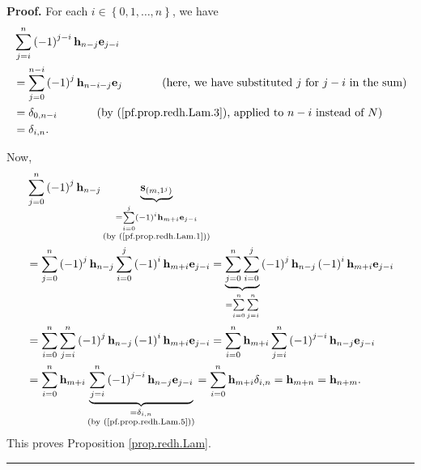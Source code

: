 \documentclass[numbers=enddot,12pt,final,onecolumn,notitlepage]{scrartcl}%
\theoremstyle{definition}
\newenvironment{proof}[1][Proof]{\noindent\textbf{#1.} }{\ \rule{0.5em}{0.5em}}
\let\sumnonlimits\sum
\renewcommand{\sum}{\sumnonlimits\limits}
\begin{document}
\begin{proof}
For each $i\in\left\{  0,1,\ldots,n\right\}  $, we have%
\begin{align}
&  \sum_{j=i}^{n}\left(  -1\right)  ^{j-i}\mathbf{h}_{n-j}\mathbf{e}%
_{j-i}\nonumber\\
&  =\sum_{j=0}^{n-i}\left(  -1\right)  ^{j}\mathbf{h}_{n-i-j}\mathbf{e}%
_{j}\ \ \ \ \ \ \ \ \ \ \left(  \text{here, we have substituted }j\text{ for
}j-i\text{ in the sum}\right) \nonumber\\
&  =\delta_{0,n-i}\ \ \ \ \ \ \ \ \ \ \left(  \text{by
(\ref{pf.prop.redh.Lam.3}), applied to }n-i\text{ instead of }N\right)
\nonumber\\
&  =\delta_{i,n}. \label{pf.prop.redh.Lam.5}%
\end{align}


Now,%
\begin{align*}
&  \sum_{j=0}^{n}\left(  -1\right)  ^{j}\mathbf{h}_{n-j}\underbrace{\mathbf{s}%
_{\left(  m,1^{j}\right)  }}_{\substack{=\sum_{i=0}^{j}\left(  -1\right)
^{i}\mathbf{h}_{m+i}\mathbf{e}_{j-i}\\\text{(by (\ref{pf.prop.redh.Lam.1}))}%
}}\\
&  =\sum_{j=0}^{n}\left(  -1\right)  ^{j}\mathbf{h}_{n-j}\sum_{i=0}^{j}\left(
-1\right)  ^{i}\mathbf{h}_{m+i}\mathbf{e}_{j-i}=\underbrace{\sum_{j=0}^{n}%
\sum_{i=0}^{j}}_{=\sum_{i=0}^{n}\sum_{j=i}^{n}}\left(  -1\right)
^{j}\mathbf{h}_{n-j}\left(  -1\right)  ^{i}\mathbf{h}_{m+i}\mathbf{e}_{j-i}\\
&  =\sum_{i=0}^{n}\sum_{j=i}^{n}\left(  -1\right)  ^{j}\mathbf{h}_{n-j}\left(
-1\right)  ^{i}\mathbf{h}_{m+i}\mathbf{e}_{j-i}=\sum_{i=0}^{n}\mathbf{h}%
_{m+i}\sum_{j=i}^{n}\left(  -1\right)  ^{j-i}\mathbf{h}_{n-j}\mathbf{e}%
_{j-i}\\
&  =\sum_{i=0}^{n}\mathbf{h}_{m+i}\underbrace{\sum_{j=i}^{n}\left(  -1\right)
^{j-i}\mathbf{h}_{n-j}\mathbf{e}_{j-i}}_{\substack{=\delta_{i,n}\\\text{(by
(\ref{pf.prop.redh.Lam.5}))}}}=\sum_{i=0}^{n}\mathbf{h}_{m+i}\delta
_{i,n}=\mathbf{h}_{m+n}=\mathbf{h}_{n+m}.
\end{align*}
This proves Proposition \ref{prop.redh.Lam}.
\end{proof}
\end{document}
